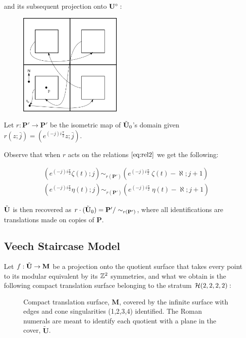 \documentclass[]{article}
\begin{document}
\noindent and its subsequent projection onto $\mathbf{U}^\circ:$

\begin{figure}[H]
\centering
\includegraphics[width=2in]{overlay.png}
\end{figure}

\begin{Def}
Let $r:\mathbf{P}'\rightarrow\mathbf{P}'$ be the isometric map of $\tilde{\mathbf{U}}_0$'s domain given  $r(z;\bar{j})=(e^{(-j)i\frac{\pi}{2}}z;\bar{j})$.
\end{Def}

Observe that when $r$ acts on the relations $\eqref{eq:rel2}$ we get the following:

\begin{equation}
\begin{split}
(e^{(-j)i\frac{\pi}{2}}\zeta(t);j)\sim_{r(\mathbf{P'})}(e^{(-j)i\frac{\pi}{2}}~{\zeta(t)-\aleph};j+1)\\
(e^{(-j)i\frac{\pi}{2}}\eta(t);j)\sim_{r(\mathbf{P'})}(e^{(-j)i\frac{\pi}{2}}~{\eta(t)-\aleph};j+1)
\end{split}
\end{equation}

$\tilde{\mathbf{U}}$ is then recovered as $r\cdot(\tilde{\mathbf{U}}_0)=\mathbf{P'}/\sim_{r(\mathbf{P}')}$, where all identifications are translations made on copies of $\mathbf{P}$.
\subsection{Veech Staircase Model}
Let $f:\tilde{\mathbf{U}}\rightarrow\mathbf{M}$ be a projection onto the quotient surface that takes every point to its modular equivalent by its $\mathbb{Z}^2$ symmetries, and what we obtain is the following compact translation surface belonging to the stratum $\mathcal{H}(2,2,2,2):$

\begin{figure}[H]
\centering

\caption{Compact translation surface, $\mathbf{M}$, covered by the infinite surface with edges and cone singularities (1,2,3,4) identified. The Roman numerals are meant to identify each quotient with a plane in the cover, $\mathbf{\tilde{\mathbf{U}}}$.}
\label{fig:mtilda}
\end{figure}
\end{document}
